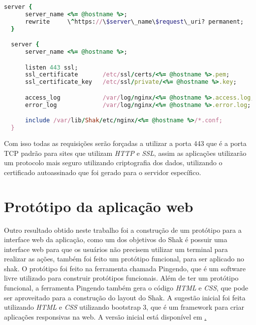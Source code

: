 \begin{lstlisting}[language=Ruby,label=dice_index,caption={Exemplo de arquivo de configuração do Nginx para aplicações web no shak}]
  server {
      server_name <%= @hostname %>;
      rewrite     \^https://\$server\_name\$request\_uri? permanent;
  }

  server {
      server_name <%= @hostname %>;

      listen 443 ssl;
      ssl_certificate       /etc/ssl/certs/<%= @hostname %>.pem;
      ssl_certificate_key   /etc/ssl/private/<%= @hostname %>.key;

      access_log            /var/log/nginx/<%= @hostname %>.access.log;
      error_log             /var/log/nginx/<%= @hostname %>.error.log;

      include /var/lib/Shak/etc/nginx/<%= @hostname %>/*.conf;
  }
\end{lstlisting}

Com isso todas as requisições serão forçadas a utilizar a porta 443 que é a porta
TCP padrão para sites que utilizam \textit{HTTP} e \textit{SSL}, assim as aplicações utilizarão
um protocolo mais seguro utilizando criptografia dos dados, utilizando o
certificado autoassinado que foi gerado para o servidor específico.

\section{Protótipo da aplicação web}
\label{sub:prototipo}

Outro resultado obtido neste trabalho foi a construção de um protótipo para a interface
web da aplicação, como um dos objetivos do Shak é possuir uma interface web para que
os usuários não precisem utilizar um terminal para realizar as ações, também foi
feito um protótipo funcional, para ser aplicado no shak. O protótipo foi feito
na ferramenta chamada Pingendo, que é um software livre utilizado para construir
protótipos funcionais. Além de ter um protótipo funcional, a ferramenta Pingendo
também gera o código \textit{HTML} e \textit{CSS}, que pode ser aproveitado para a construção
do layout do Shak. A sugestão inicial foi feita utilizando \textit{HTML} e \textit{CSS} utilizando
bootstrap 3, que é um framework para criar aplicações responsivas na web. A versão
inicial está disponível em \href{https://gitlab.com/Thiagovsk/shak_frontend/tree/master}.


